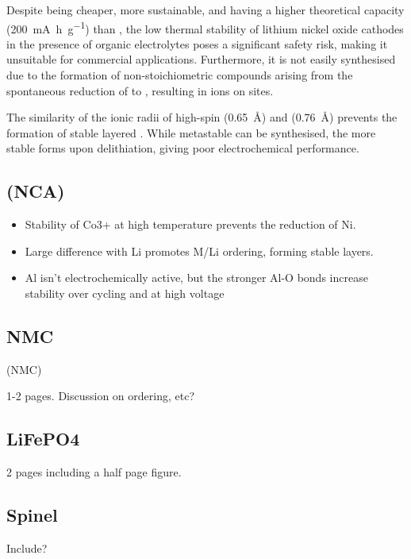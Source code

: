 \begin{labeling}{\textbf{}}
	\item [\textbf{\ce{LiNiO2}}] Despite being cheaper, more sustainable, and having a higher theoretical capacity (\SI{200}{\milli\ampere\hour\per\gram}) than , the low thermal stability of lithium nickel oxide cathodes in the presence of organic electrolytes poses a significant safety risk, making it unsuitable for commercial applications.
	Furthermore, it is not easily synthesised due to the formation of non-stoichiometric compounds arising from the spontaneous reduction of  to  , resulting in  ions on  sites.
	\item [\textbf{\ce{LiMnO2}}] The similarity of the ionic radii of high-spin  (\SI{0.65}{\angstrom}) and  (\SI{0.76}{\angstrom}) prevents the formation of stable layered .
	While metastable  can be synthesised, the more stable  forms upon delithiation, giving poor electrochemical performance.
\end{labeling}

\subsection{ (NCA)}
\begin{itemize}
	\item Stability of Co3+ at high temperature prevents the reduction of Ni.
	\item Large difference with Li promotes M/Li ordering, forming stable layers.
	\item Al isn't electrochemically active, but the stronger Al-O bonds increase stability over cycling and at high voltage
\end{itemize}

\subsection{NMC}

 (NMC) 

1-2 pages.
Discussion on ordering, etc?



\subsection{LiFePO4}
2 pages including a half page figure.

\subsection{Spinel}
Include?

